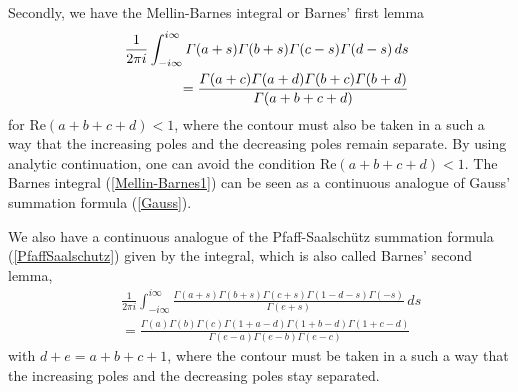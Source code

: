 \documentclass[envcountchap,graybox]{svmono}
\renewcommand{\Gamma}{\varGamma}
\begin{document}
Secondly, we have the Mellin-Barnes integral or Barnes' first lemma
\begin{eqnarray}
\label{Mellin-Barnes1}\index{Mellin-Barnes integral}\index{Barnes' first lemma}
& &\frac{1}{2\pi i}\int_{-i\infty}^{i\infty}\Gamma(a+s)\Gamma(b+s)\Gamma(c-s)\Gamma(d-s)\,ds\nonumber\\
& &{}=\frac{\Gamma(a+c)\Gamma(a+d)\Gamma(b+c)\Gamma(b+d)}{\Gamma(a+b+c+d)}
\end{eqnarray}
for $\textrm{Re}(a+b+c+d)<1$, where the contour must also be taken in a such a
way that the increasing poles and the decreasing poles remain separate. By using
analytic continuation, one can avoid the condition $\textrm{Re}(a+b+c+d)<1$. The
Barnes integral (\ref{Mellin-Barnes1}) can be seen as a continuous analogue of
Gauss' summation formula (\ref{Gauss}).

We also have a continuous analogue of the Pfaff-Saalsch\"utz summation
formula (\ref{PfaffSaalschutz}) given by the integral, which is also
called Barnes' second lemma,
\begin{eqnarray}
\label{Mellin-Barnes2}
& &\frac{1}{2\pi i}\int_{-i\infty}^{i\infty}
\frac{\Gamma(a+s)\Gamma(b+s)\Gamma(c+s)\Gamma(1-d-s)\Gamma(-s)}{\Gamma(e+s)}\,ds\nonumber\\
& &{}=\frac{\Gamma(a)\Gamma(b)\Gamma(c)\Gamma(1+a-d)\Gamma(1+b-d)\Gamma(1+c-d)}
{\Gamma(e-a)\Gamma(e-b)\Gamma(e-c)}
\end{eqnarray}
with $d+e=a+b+c+1$, where the contour must be taken in a such a way that
the increasing poles and the decreasing poles stay separated.
\end{document}
